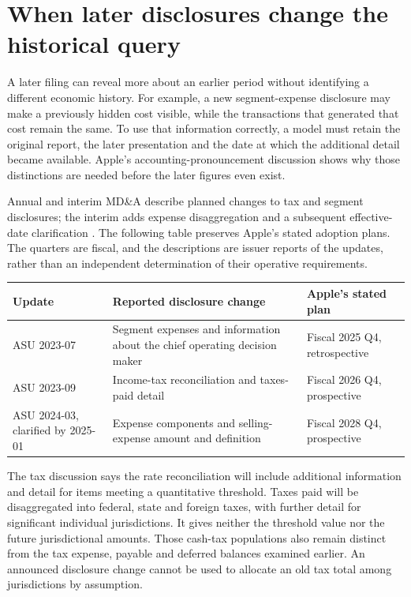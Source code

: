 \section{When later disclosures change the historical query}
\label{sec:apple-pronouncements}

A later filing can reveal more about an earlier period without identifying a
different economic history. For example, a new segment-expense disclosure may
make a previously hidden cost visible, while the transactions that generated
that cost remain the same. To use that information correctly, a model must
retain the original report, the later presentation and the date at which the
additional detail became available. Apple's accounting-pronouncement discussion
shows why those distinctions are needed before the later figures even exist.

Annual and interim MD\&A describe planned changes to tax and segment disclosures;
the interim adds expense disaggregation and a subsequent effective-date
clarification \citep[Recent Accounting Pronouncements, printed p.~26]{apple2024}
\citep[Recent Accounting Pronouncements, printed p.~17]{apple2025q1}.
The following table preserves Apple's stated adoption plans. The quarters are
fiscal, and the descriptions are issuer reports of the updates, rather than an
independent determination of their operative requirements.
\begin{center}
\small
\begin{tabular}{p{}p{}p{}}
\toprule
Update & Reported disclosure change & Apple's stated plan\\\midrule
ASU 2023-07 & Segment expenses and information about the chief operating
decision maker & Fiscal 2025 Q4, retrospective\\
ASU 2023-09 & Income-tax reconciliation and taxes-paid detail & Fiscal 2026 Q4,
prospective\\
ASU 2024-03, clarified by 2025-01 & Expense components and selling-expense
amount and definition & Fiscal 2028 Q4, prospective\\\bottomrule
\end{tabular}
\end{center}

The tax discussion says the rate reconciliation will include additional
information and detail for items meeting a quantitative threshold. Taxes paid
will be disaggregated into federal, state and foreign taxes, with further detail
for significant individual jurisdictions. It gives neither the threshold value
nor the future jurisdictional amounts. Those cash-tax populations also remain
distinct from the tax expense, payable and deferred balances examined earlier.
An announced disclosure change cannot be used to allocate an old tax total
among jurisdictions by assumption.

